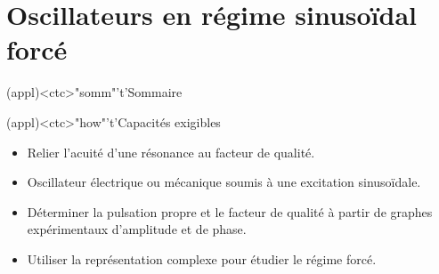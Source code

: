 \documentclass[../../main/main.tex]{subfiles}
\begin{document}
\setcounter{chapter}{6}


\chapter{Oscillateurs en régime sinusoïdal forcé}

\vspace*{\fill}

\begin{tcn}(appl)<ctc>"somm"'t'{Sommaire}
	\let\item\olditem
	\vspace{-15pt}
	\minitoc
	\vspace{-25pt}
\end{tcn}

\begin{tcn}[sidebyside](appl)<ctc>"how"'t'{Capacités exigibles}
	\begin{itemize}[label=\rcheck]
		\item Relier l'acuité d’une résonance au facteur de qualité.
		\item Oscillateur électrique ou mécanique soumis à une excitation
		      sinusoïdale.
	\end{itemize}
	\tcblower
	\begin{itemize}[label=\rcheck]
		\item Déterminer la pulsation propre et le facteur de qualité à partir de
		      graphes expérimentaux d’amplitude et de phase.
		\item Utiliser la représentation complexe pour étudier le régime forcé.
	\end{itemize}
\end{tcn}

\vspace{-20pt}

\end{document}
